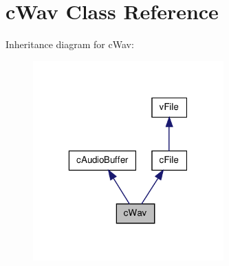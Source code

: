 \hypertarget{classc_wav}{
\section{cWav Class Reference}
\label{classc_wav}
}


Inheritance diagram for cWav:
\nopagebreak
\begin{figure}[H]
\begin{center}
\leavevmode
\includegraphics[width=208pt]{classc_wav__inherit__graph}
\end{center}
\end{figure}


